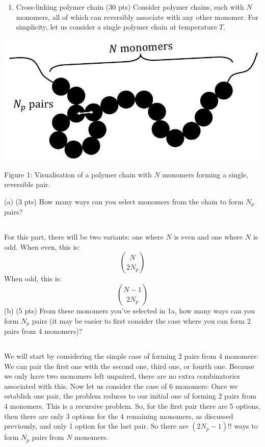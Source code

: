 \documentclass[10pt]{article}
\begin{document}
\section{}
\begin{enumerate}
  \item Cross-linking polymer chain (30 pts) Consider polymer chains, each with $N$ monomers, all of which can reversibly associate with any other monomer. For simplicity, let us consider a single polymer chain at temperature $T$.
\end{enumerate}

\begin{center}
\includegraphics[max width=\textwidth]{2024_02_03_75704bce2caff28cbfb1g-2}
\end{center}

Figure 1: Visualisation of a polymer chain with $N$ monomers forming a single, reversible pair.

(a) (3 pts) How many ways can you select monomers from the chain to form $N_{p}$ pairs?
\subsection{}
 For this part, there will be two variants: one where $N$ is even and one where $N$ is odd. When even, this is:
\begin{equation}
  \binom{N}{2N_p}
\end{equation} 
When odd, this is:
\begin{equation}
  \binom{N-1}{2N_p}
\end{equation}
(b) (5 pts) From these monomers you've selected in 1a, how many ways can you form $N_{p}$ pairs (it may be easier to first consider the case where you can form 2 pairs from 4 monomers)?
\subsection{}
We will start by considering the simple case of forming 2 pairs from 4 monomers:
We can pair the first one with the second one, third one, or fourth one. Because we only have two monomers left unpaired, there are no extra combinatorics associated with this. Now let us consider the case of 6 monomers: Once we establish one pair, the problem reduces to our initial one of forming 2 pairs from 4 monomers. This is a recursive problem. So, for the first pair there are 5 options, then there are only 3 options for the 4 remaining monomers, as discussed previously, and only 1 option for the last pair. So there are $(2N_p -1)!!$ ways to form $N_p$ pairs from $N$ monomers.
\end{document}
